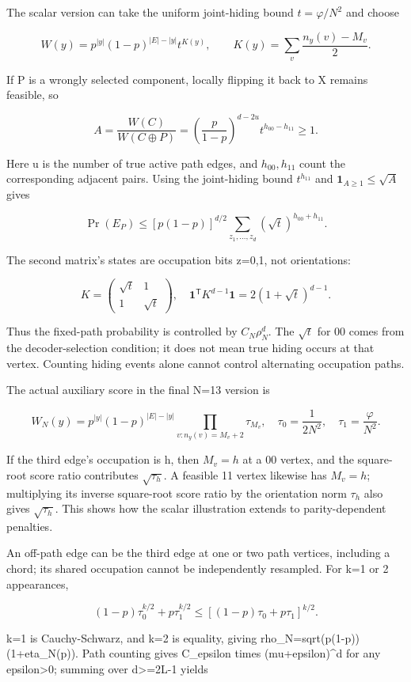 \documentclass[11pt,a4paper]{article}
\begin{document}
The scalar version can take the uniform joint-hiding bound \(t=\varphi/N^2\) and choose

\[
W(y)=p^{|y|}(1-p)^{|E|-|y|}t^{K(y)},\qquad
K(y)=\sum_v\frac{n_y(v)-M_v}{2}.
\]

If P is a wrongly selected component, locally flipping it back to X remains feasible, so

\[
A=\frac{W(C)}{W(C\oplus P)}
=\left(\frac p{1-p}\right)^{d-2u}t^{h_{00}-h_{11}}\ge1.
\]

Here u is the number of true active path edges, and \(h_{00},h_{11}\) count the corresponding adjacent pairs. Using the joint-hiding bound \(t^{h_{11}}\) and \(\mathbf1_{A\ge1}\le\sqrt A\) gives

\[
\Pr(E_P)\le[p(1-p)]^{d/2}
\sum_{z_1,\ldots,z_d}(\sqrt t)^{h_{00}+h_{11}}.
\]

The second matrix's states are occupation bits z=0,1, not orientations:

\[
K=\begin{pmatrix}\sqrt t&1\\1&\sqrt t\end{pmatrix},
\quad\mathbf1^{\mathsf T}K^{d-1}\mathbf1=2(1+\sqrt t)^{d-1}.
\]

Thus the fixed-path probability is controlled by \(C_N\rho_N^d\). The \(\sqrt t\) for 00 comes from the decoder-selection condition; it does not mean true hiding occurs at that vertex. Counting hiding events alone cannot control alternating occupation paths.

The actual auxiliary score in the final N=13 version is

\[
W_N(y)=p^{|y|}(1-p)^{|E|-|y|}
\prod_{v:n_y(v)=M_v+2}\tau_{M_v},
\quad\tau_0=\frac1{2N^2},\quad\tau_1=\frac\varphi{N^2}.
\]

If the third edge's occupation is h, then \(M_v=h\) at a 00 vertex, and the square-root score ratio contributes \(\sqrt{\tau_h}\). A feasible 11 vertex likewise has \(M_v=h\); multiplying its inverse square-root score ratio by the orientation norm \(\tau_h\) also gives \(\sqrt{\tau_h}\). This shows how the scalar illustration extends to parity-dependent penalties.

An off-path edge can be the third edge at one or two path vertices, including a chord; its shared occupation cannot be independently resampled. For k=1 or 2 appearances,

\[
(1-p)\tau_0^{k/2}+p\tau_1^{k/2}
\le[(1-p)\tau_0+p\tau_1]^{k/2}.
\]

k=1 is Cauchy-Schwarz, and k=2 is equality, giving rho\_N=sqrt(p(1-p))(1+eta\_N(p)). Path counting gives C\_epsilon times (mu+epsilon)\textasciicircum{}d for any epsilon>0; summing over d>=2L-1 yields
\end{document}
